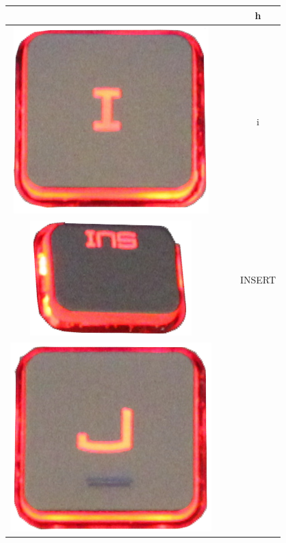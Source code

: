 \begin{longtable}{cccc}
\begin{minipage}[c]{.3\textwidth}
\vspace{0.2cm}
\end{minipage} & & & h\\
\hline
\begin{minipage}[c]{.3\textwidth}
\vspace{0.2cm}
\includegraphics[scale=0.1]{Images/KeyMapping/i}
\vspace{0.2cm}
\end{minipage} & & & i\\
\hline
\begin{minipage}[c]{.3\textwidth}
\vspace{0.2cm}
\includegraphics[scale=0.1]{Images/KeyMapping/INSERT}
\vspace{0.2cm}
\end{minipage} & & & INSERT\\
\hline
\begin{minipage}[c]{.3\textwidth}
\vspace{0.2cm}
\includegraphics[scale=0.1]{Images/KeyMapping/j}

\end{minipage}
\end{longtable}
